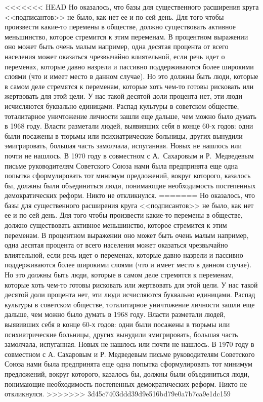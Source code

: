 \documentclass{book}
\begin{document}
<<<<<<< HEAD
Но оказалось, что базы для существенного расширения круга <<подписантов>> не было, как нет ее и по сей день. Для того чтобы произвести какие‑то перемены в обществе, должно существовать активное меньшинство, которое стремится к этим переменам. В процентном выражении оно может быть очень малым например, одна десятая процента от всего населения может оказаться чрезвычайно влиятельной, если речь идет о переменах, которые давно назрели и пассивно поддерживаются более широкими слоями (что и имеет место в данном случае). Но это должны быть люди, которые в самом деле стремятся к переменам, которые хоть чем‑то готовы рисковать или жертвовать для этой цели. У нас такой десятой доли процента нет, эти люди исчисляются буквально единицами. Распад культуры в советском обществе, тоталитарное уничтожение лично­сти зашли еще дальше, чем можно было думать в 1968 году. Власти разметали людей, выявивших себя в конце 60‑х годов: одни были посажены в тюрьмы или психиатрические больницы, других вынудили эмигрировать, большая часть замолчала, испуганная. Новых не нашлось или почти не нашлось. В 1970 году в совместном с А.~Сахаровым и Р.~Медведевым письме руководителям Советского Союза нами была предпринята еще одна попытка сформулировать тот минимум предложений, вокруг которого, казалось бы, должны были объединиться люди, понимающие необходимость постепенных демократических реформ. Никто не откликнулся.
=======
Но оказалось, что базы для существенного расширения круга <<подписантов>> не было, как нет ее и по сей день. Для того чтобы 
произвести какие-то перемены в обществе, должно существовать активное меньшинство, которое стремится к этим переменам. В 
процентном выражении оно может быть очень малым например, одна десятая процента от всего населения может оказаться чрезвычайно 
влиятельной, если речь идет о переменах, которые давно назрели и пассивно поддерживаются более широкими слоями (что и имеет 
место в данном случае). Но это должны быть люди, которые в самом деле стремятся к переменам, которые хоть чем-то готовы 
рисковать или жертвовать для этой цели. У нас такой десятой доли процента нет, эти люди исчисляются буквально единицами. Распад 
культуры в советском обществе, тоталитарное уничтожение лично­сти зашли еще дальше, чем можно было думать в 1968 году. Власти 
разметали людей, выявивших себя в конце 60-х годов: одни были посажены в тюрьмы или психиатрические больницы, других вынудили 
эмигрировать, большая часть 
замолчала, испуганная. Новых не нашлось или почти не нашлось. В 1970 году в совместном с А. Сахаровым и Р. Медведевым письме 
руководителям Советского Союза нами была предпринята еще одна попытка сформулировать тот минимум предложений, вокруг которого, 
казалось бы, должны были объединиться люди, понимающие необходимость постепенных демократических реформ. Никто не откликнулся.
>>>>>>> 3d45c7403ddd39d9e516bd79e0a7b7ca9e1dc159
\end{document}
